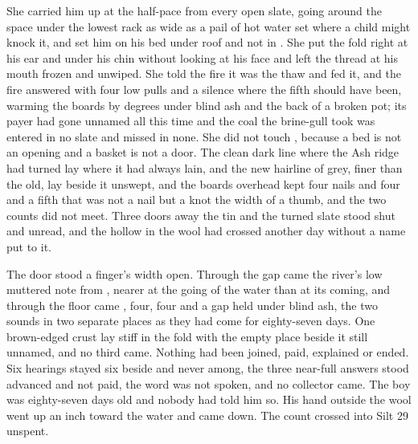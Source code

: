 She carried him up at the half-pace from every open slate, going around the space under the lowest rack as wide as a pail of hot water set where a child might knock it, and set him on his bed under  roof and not in . She put the fold right at his ear and under his chin without looking at his face and left the thread at his mouth frozen and unwiped. She told the fire it was the thaw and fed it, and the fire answered with four low pulls and a silence where the fifth should have been, warming the boards by degrees under blind ash and the back of a broken pot; its payer had gone unnamed all this time and the coal the brine-gull took was entered in no slate and missed in none. She did not touch , because a bed is not an opening and a basket is not a door. The clean dark line where the Ash ridge had turned lay where it had always lain, and the new hairline of grey, finer than the old, lay beside it unswept, and the boards overhead kept four nails and four and a fifth that was not a nail but a knot the width of a thumb, and the two counts did not meet. Three doors away the tin and the turned slate stood shut and unread, and the hollow in the wool had crossed another day without a name put to it.

The door stood a finger's width open. Through the gap came the river's low muttered note from , nearer at the going of the water than at its coming, and through the floor came , four, four and a gap held under blind ash, the two sounds in two separate places as they had come for eighty-seven days. One brown-edged crust lay stiff in the fold with the empty place beside it still unnamed, and no third came. Nothing had been joined, paid, explained or ended. Six hearings stayed six beside and never among, the three near-full answers stood advanced and not paid, the word was not spoken, and no collector came. The boy was eighty-seven days old and nobody had told him so. His hand outside the wool went up an inch toward the water and came down. The count crossed into Silt 29 unspent.
